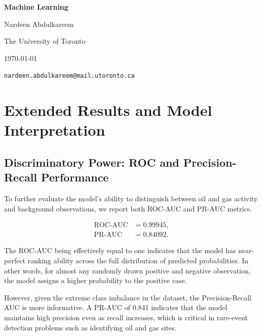 \documentclass[12pt]{article}
\begin{document}
\begin{titlepage}
    \thispagestyle{empty} %
    \centering
    \vspace*{\fill}

    {\Large \textbf{Machine Learning} \par}

    \vspace{3em}
    {\large Nardeen Abdulkareem \par}
    {\normalsize The University of Toronto \par}
    {\normalsize \today \par}
    {\texttt{nardeen.abdulkareem@mail.utoronto.ca} \par}

    \vspace*{\fill}
\end{titlepage}
\clearpage
\section{Extended Results and Model Interpretation}

\subsection{Discriminatory Power: ROC and Precision-Recall Performance}

To further evaluate the model's ability to distinguish between oil and gas activity and background observations, we report both ROC-AUC and PR-AUC metrics.

\begin{align*}
\text{ROC-AUC} &= 0.99945, \\
\text{PR-AUC}  &= 0.84092.
\end{align*}

The ROC-AUC being effectively equal to one indicates that the model has near-perfect ranking ability across the full distribution of predicted probabilities. In other words, for almost any randomly drawn positive and negative observation, the model assigns a higher probability to the positive case.

However, given the extreme class imbalance in the dataset, the Precision-Recall AUC is more informative. A PR-AUC of 0.841 indicates that the model maintains high precision even as recall increases, which is critical in rare-event detection problems such as identifying oil and gas sites.
\end{document}
